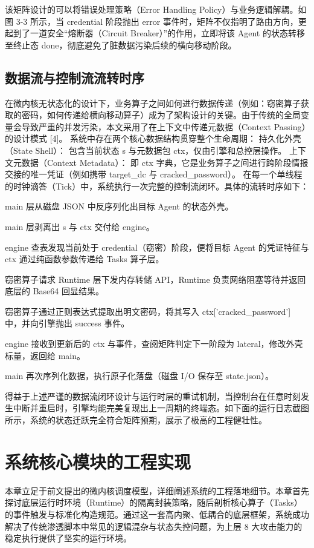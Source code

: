 \documentclass[twoside,openright]{xduugthesis}
\begin{document}
该矩阵设计的可以将错误处理策略（Error Handling Policy）与业务逻辑解耦。如图 3-3 所示，当 credential 阶段抛出 error 事件时，矩阵不仅指明了路由方向，更起到了一道安全“熔断器（Circuit Breaker）”的作用，立即将该 Agent 的状态转移至终止态 done，彻底避免了脏数据污染后续的横向移动阶段。


\section{数据流与控制流流转时序}

在微内核无状态化的设计下，业务算子之间如何进行数据传递（例如：窃密算子获取的密码，如何传递给横向移动算子）成为了架构设计的关键。由于传统的全局变量会导致严重的并发污染，本文采用了在上下文中传递元数据（Context Passing）的设计模式 [4]。
系统中存在两个核心数据结构贯穿整个生命周期：
持久化外壳（State Shell）： 包含当前状态 s 与元数据包 ctx，仅由引擎和总控层操作。
上下文元数据（Context Metadata）： 即 ctx 字典，它是业务算子之间进行跨阶段情报交接的唯一凭证（例如携带 target_dc 与 cracked_password）。
在每一个单线程的时钟滴答（Tick）中，系统执行一次完整的控制流闭环。具体的流转时序如下：

main 层从磁盘 JSON 中反序列化出目标 Agent 的状态外壳。

main 层剥离出 s 与 ctx 交付给 engine。

engine 查表发现当前处于 credential（窃密）阶段，便将目标 Agent 的凭证特征与 ctx 通过纯函数参数传递给 Tasks 算子层。

窃密算子请求 Runtime 层下发内存转储 API，Runtime 负责网络阻塞等待并返回底层的 Base64 回显结果。

窃密算子通过正则表达式提取出明文密码，将其写入 ctx['cracked_password'] 中，并向引擎抛出 success 事件。

engine 接收到更新后的 ctx 与事件，查阅矩阵判定下一阶段为 lateral，修改外壳标量，返回给 main。

main 再次序列化数据，执行原子化落盘（磁盘 I/O 保存至 state.json）。

得益于上述严谨的数据流闭环设计与运行时层的重试机制，当控制台在任意时刻发生中断并重启时，引擎均能完美复现出上一周期的终端态。如下面的运行日志截图所示，系统的状态迁跃完全符合矩阵预期，展示了极高的工程健壮性。

\chapter{系统核心模块的工程实现}

本章立足于前文提出的微内核调度模型，详细阐述系统的工程落地细节。本章首先探讨底层运行时环境（Runtime）的隔离封装策略，随后剖析核心算子（Tasks）的事件触发与标准化构造规范。通过这一套高内聚、低耦合的底层框架，系统成功解决了传统渗透脚本中常见的逻辑混杂与状态失控问题，为上层 8 大攻击能力的稳定执行提供了坚实的运行环境。
\end{document}
